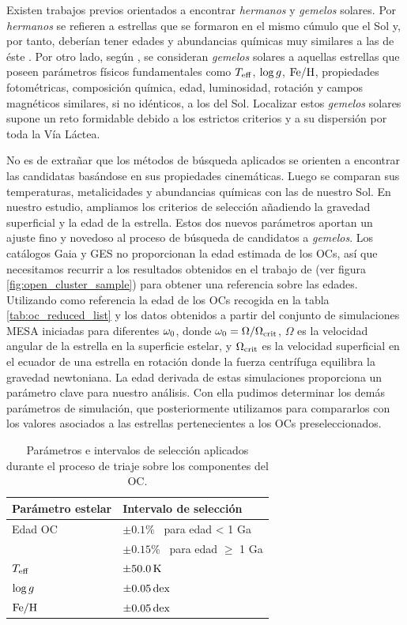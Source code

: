 Existen trabajos previos orientados a encontrar \textit{hermanos} y \textit{gemelos} solares. Por \textit{hermanos} se refieren a estrellas que se formaron en el mismo cúmulo que el Sol y, por tanto, deberían tener edades y abundancias químicas muy similares a las de éste \citep[ver][y referencias en él]{Adibekyan2018}. Por otro lado, según \cite{Strobel1996}, se consideran \textit{gemelos} solares a aquellas estrellas que poseen parámetros físicos fundamentales como $T_{\mathrm{eff}}$, $\mathrm{log} \, g$, $\mathrm{Fe}/\mathrm{H}$, propiedades fotométricas, composición química, edad, luminosidad, rotación y campos magnéticos similares, si no idénticos, a los del Sol. Localizar estos \textit{gemelos} solares supone un reto formidable debido a los estrictos criterios y a su dispersión por toda la Vía Láctea.\par 

No es de extrañar que los métodos de búsqueda aplicados se orienten a encontrar las candidatas basándose en sus propiedades cinemáticas. Luego se comparan sus temperaturas, metalicidades y abundancias químicas con las de nuestro Sol. En nuestro estudio, ampliamos los criterios de selección añadiendo la gravedad superficial y la edad de la estrella. Estos dos nuevos parámetros aportan un ajuste fino y novedoso al proceso de búsqueda de candidatos a \textit{gemelos}. Los catálogos Gaia y GES no proporcionan la edad estimada de los OCs, así que necesitamos recurrir a los resultados obtenidos en el trabajo de \cite{Bragaglia2022} (ver figura \ref{fig:open_cluster_sample}) para obtener una referencia sobre las edades. Utilizando como referencia la edad de los OCs recogida en la tabla \ref{tab:oc_reduced_list} y los datos obtenidos a partir del conjunto de simulaciones MESA iniciadas para diferentes $\omega_{\mathrm{0}}$, donde $\omega_{\mathrm{0}} = \Omega / \Omega_{\mathrm{crit}}$, $\Omega$ es la velocidad angular de la estrella en la superficie estelar, y $\Omega_{\mathrm{crit}}$ es la velocidad superficial en el ecuador de una estrella en rotación donde la fuerza centrífuga equilibra la gravedad newtoniana. La edad derivada de estas simulaciones proporciona un parámetro clave para nuestro análisis. Con ella pudimos determinar los demás parámetros de simulación, que posteriormente utilizamos para compararlos con los valores asociados a las estrellas pertenecientes a los OCs preseleccionados.\par

\begin{table}
	\centering
	\begin{tabular}{ll} 
		\hline
		Parámetro estelar & Intervalo de selección\\
		\hline
		Edad OC & $\pm0.1\%$ \, para edad < 1 Ga \\
		& $\pm0.15\%$ \, para edad $\geq$ 1 Ga \\
		$T_{\mathrm{eff}}$ & $\pm 50.0 \, \mathrm{K}$ \\
		$\mathrm{log} \, g$ & $\pm 0.05 \, \mathrm{dex}$\\
		$\mathrm{Fe}/\mathrm{H}$ & $\pm 0.05 \, \mathrm{dex}$\\
		\hline
	\end{tabular}
	\caption{Parámetros e intervalos de selección aplicados durante el proceso de triaje sobre los componentes del OC.}
	\label{tab:sel_params}
\end{table}

